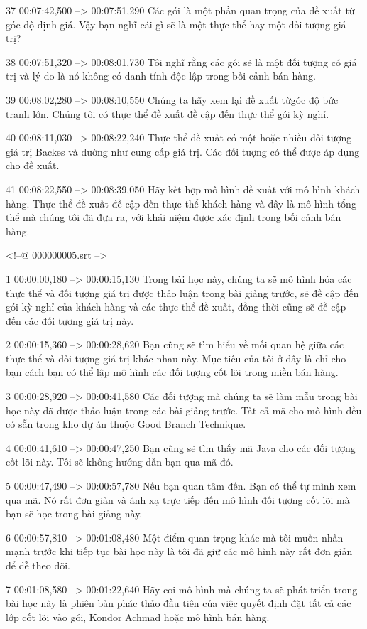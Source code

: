 37
00:07:42,500 --> 00:07:51,290
Các gói là một phần quan trọng của đề xuất từ ​​góc độ định giá.  Vậy bạn nghĩ cái gì sẽ là một thực thể hay một đối tượng giá trị?

38
00:07:51,320 --> 00:08:01,730
Tôi nghĩ rằng các gói sẽ là một đối tượng có giá trị và lý do là nó không có danh tính độc lập trong bối cảnh bán hàng.

39
00:08:02,280 --> 00:08:10,550
Chúng ta hãy xem lại đề xuất từ ​​góc độ bức tranh lớn.  Chúng tôi có thực thể đề xuất đề cập đến thực thể gói kỳ nghỉ.

40
00:08:11,030 --> 00:08:22,240
Thực thể đề xuất có một hoặc nhiều đối tượng giá trị Backes và dường như cung cấp giá trị.  Các đối tượng có thể được áp dụng cho đề xuất.

41
00:08:22,550 --> 00:08:39,050
Hãy kết hợp mô hình đề xuất với mô hình khách hàng.  Thực thể đề xuất đề cập đến thực thể khách hàng và đây là mô hình tổng thể mà chúng tôi đã đưa ra, với khái niệm được xác định trong bối cảnh bán hàng.

<!--@ 000000005.srt -->

1
00:00:00,180 --> 00:00:15,130
Trong bài học này, chúng ta sẽ mô hình hóa các thực thể và đối tượng giá trị được thảo luận trong bài giảng trước, sẽ đề cập đến gói kỳ nghỉ của khách hàng và các thực thể đề xuất, đồng thời cũng sẽ đề cập đến các đối tượng giá trị này.

2
00:00:15,360 --> 00:00:28,620
Bạn cũng sẽ tìm hiểu về mối quan hệ giữa các thực thể và đối tượng giá trị khác nhau này.  Mục tiêu của tôi ở đây là chỉ cho bạn cách bạn có thể lập mô hình các đối tượng cốt lõi trong miền bán hàng.

3
00:00:28,920 --> 00:00:41,580
Các đối tượng mà chúng ta sẽ làm mẫu trong bài học này đã được thảo luận trong các bài giảng trước.  Tất cả mã cho mô hình đều có sẵn trong kho dự án thuộc Good Branch Technique.

4
00:00:41,610 --> 00:00:47,250
Bạn cũng sẽ tìm thấy mã Java cho các đối tượng cốt lõi này.  Tôi sẽ không hướng dẫn bạn qua mã đó.

5
00:00:47,490 --> 00:00:57,780
Nếu bạn quan tâm đến.  Bạn có thể tự mình xem qua mã.  Nó rất đơn giản và ánh xạ trực tiếp đến mô hình đối tượng cốt lõi mà bạn sẽ học trong bài giảng này.

6
00:00:57,810 --> 00:01:08,480
Một điểm quan trọng khác mà tôi muốn nhấn mạnh trước khi tiếp tục bài học này là tôi đã giữ các mô hình này rất đơn giản để dễ theo dõi.

7
00:01:08,580 --> 00:01:22,640
Hãy coi mô hình mà chúng ta sẽ phát triển trong bài học này là phiên bản phác thảo đầu tiên của việc quyết định đặt tất cả các lớp cốt lõi vào gói, Kondor Achmad hoặc mô hình bán hàng.

